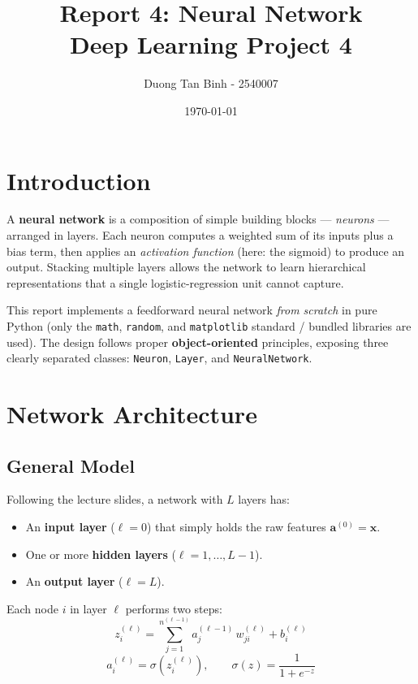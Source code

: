 \documentclass[12pt,a4paper]{article}
\title{\textbf{Report 4: Neural Network} \\ \large Deep Learning Project 4}
\author{Duong Tan Binh - 2540007}
\date{\today}
\begin{document}
\maketitle
\tableofcontents
\newpage

\section{Introduction}

A \textbf{neural network} is a composition of simple building blocks ---
\emph{neurons} --- arranged in layers.
Each neuron computes a weighted sum of its inputs plus a bias term, then
applies an \emph{activation function} (here: the sigmoid) to produce an output.
Stacking multiple layers allows the network to learn hierarchical
representations that a single logistic-regression unit cannot capture.

This report implements a feedforward neural network \emph{from scratch} in
pure Python (only the \texttt{math}, \texttt{random}, and \texttt{matplotlib}
standard / bundled libraries are used).
The design follows proper \textbf{object-oriented} principles, exposing three
clearly separated classes: \texttt{Neuron}, \texttt{Layer}, and
\texttt{NeuralNetwork}.

\section{Network Architecture}

\subsection{General Model}

Following the lecture slides, a network with $L$ layers has:
\begin{itemize}
    \item An \textbf{input layer} ($\ell = 0$) that simply holds the raw
          features $\mathbf{a}^{(0)} = \mathbf{x}$.
    \item One or more \textbf{hidden layers} ($\ell = 1, \ldots, L{-}1$).
    \item An \textbf{output layer} ($\ell = L$).
\end{itemize}

Each node $i$ in layer $\ell$ performs two steps:
\begin{equation}
    z_i^{(\ell)} = \sum_{j=1}^{n^{(\ell-1)}} a_j^{(\ell-1)}\, w_{ji}^{(\ell)} + b_i^{(\ell)}
    \label{eq:linear}
\end{equation}
\begin{equation}
    a_i^{(\ell)} = \sigma\!\left(z_i^{(\ell)}\right), \qquad
    \sigma(z) = \frac{1}{1 + e^{-z}}
    \label{eq:sigmoid}
\end{equation}
\end{document}
